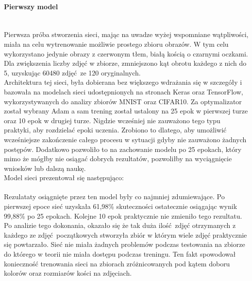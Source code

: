 \paragraph{Pierwszy model} \mbox{}\\
Pierwsza próba stworzenia sieci, mając na uwadze wyżej wspomniane wątpliwości, miała
na celu wytrenowanie możliwie prostego zbioru obrazów. W tym celu wykorzystano
jedynie obrazy z czerwonym tłem, białą kością o czarnymi oczkami. Dla zwiększenia
liczby zdjęć w zbiorze, zmniejszono kąt obrotu każdego z nich do 5,
uzyskując 60480 zdjęć ze 120 oryginalnych. \\
Architektura tej sieci, była dobierana bez większego wdrażania się w szczegóły i
bazowała na modelach sieci udostępnionych na stronach Keras oraz TensorFlow,
wykorzystywanych do analizy zbiorów MNIST oraz CIFAR10. Za optymalizator został wybrany
Adam a sam trening został ustalony na 25 epok w pierwszej turze oraz 10 epok w drugiej
turze. Nigdzie wcześniej nie zauważono tego typu praktyki, aby rozdzielać epoki uczenia.
Zrobiono to dlatego, aby umożliwić wcześniejsze zakończenie całego procesu w sytuacji
gdyby nie zauważono żadnych postępów. Dodatkowo pozwoliło to na zachowanie modelu
po 25 epokach, który mimo że mógłby nie osiągać dobrych rezultatów, pozwoliłby
na wyciągnięcie wniosków lub dalszą naukę. \\
Model sieci prezentował się następująco: \\\\
Rezulataty osiągnięte przez ten model były co najmniej zdumiewające. Po pierwszej epoce
sieć uzyskała 61,98\% skuteczności ostatecznie osiągając wynik 99,88\% po 25 epokach.
Kolejne 10 epok praktycznie nie zmieniło tego rezultatu. \\
Po analizie tego dokonania, okazało się że tak duża ilość zdjęć otrzymanych
z każdego ze zdjęć początkowych stworzyła zbiór w którym wiele zdjęć praktycznie się
powtarzało. Sieć nie miała żadnych problemów podczas testowania na zbiorze
do którego w teorii nie miała dostępu podczas treningu. Ten fakt spowodował konieczność
trenowania sieci na zbiorach zróżnicowanych pod kątem doboru kolorów oraz rozmiarów
kości na zdjęciach.

